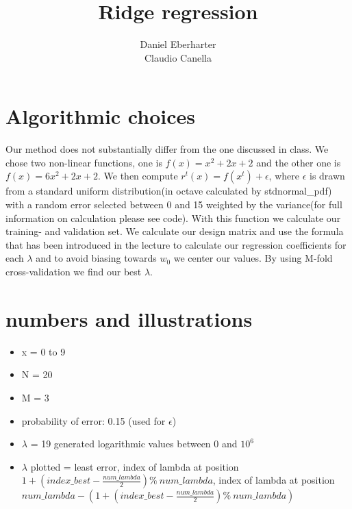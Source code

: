 \documentclass[12pt]{article}
\author{Daniel Eberharter\\ Claudio Canella}
\title{Ridge regression}
\begin{document}
\maketitle


\section{Algorithmic choices}
Our method does not substantially differ from the one discussed in class. We chose two non-linear functions, one is $f(x) = x^2 + 2x + 2$ and the other one is $f(x) = 6x^2 + 2x + 2$. We then compute $r^t(x) = f(x^t) + \epsilon$, where $\epsilon$ is drawn from a standard uniform distribution(in octave calculated by stdnormal\_pdf) with a random error selected between 0 and 15 weighted by the variance(for full information on calculation please see code). With this function we calculate our training- and validation set. We calculate our design matrix and use the formula that has been introduced in the lecture to calculate our regression coefficients for each $\lambda$ and to avoid biasing towards $w_0$ we center our values. By using M-fold cross-validation we find our best $\lambda$.


\section{numbers and illustrations}
	\begin{itemize} \label{plotted}
		\item x = 0 to 9
		\item N = 20
		\item M = 3
		\item probability of error: 0.15 (used for $\epsilon$)
		\item $\lambda$ = 19 generated logarithmic  values between 0 and $10^6$\\
		\item $\lambda$ plotted = least error, index of lambda at position $1+(index\_best - \frac{num\_lambda}{2}) \%\ num\_lambda$, index of lambda at position $num\_lambda -( 1+(index\_best - \frac{num\_lambda}{2}) \%\ num\_lambda)$
	\end{itemize}
\end{document}
